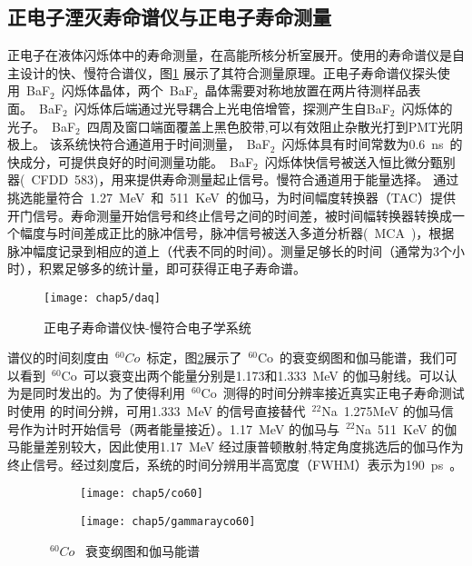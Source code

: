 \subsection{正电子湮灭寿命谱仪与正电子寿命测量}
正电子在液体闪烁体中的寿命测量，在高能所核分析室展开。使用的寿命谱仪是自主设计的快、慢符合谱仪，图\ref{fig:p541} 展示了其符合测量原理。正电子寿命谱仪探头使用~BaF$_{2}$~闪烁体晶体，两个~BaF$_{2}$~晶体需要对称地放置在两片待测样品表面。~BaF$_{2}$~闪烁体后端通过光导耦合上光电倍增管，探测产生自BaF$_{2}$~闪烁体的光子。~BaF$_{2}$~四周及窗口端面覆盖上黑色胶带,可以有效阻止杂散光打到PMT光阴极上。%
该系统快符合通道用于时间测量，~BaF$_{2}$~闪烁体具有时间常数为0.6~ns~的快成分，可提供良好的时间测量功能。~BaF$_{2}$~闪烁体快信号被送入恒比微分甄别器(~CFDD~583)，用来提供寿命测量起止信号。慢符合通道用于能量选择。
通过挑选能量符合~1.27~MeV~和~511~KeV~的伽马，为时间幅度转换器（TAC）提供开门信号。寿命测量开始信号和终止信号之间的时间差，被时间幅转换器转换成一个幅度与时间差成正比的脉冲信号，脉冲信号被送入多道分析器(~MCA~)，根据脉冲幅度记录到相应的道上（代表不同的时间）。测量足够长的时间（通常为3个小时），积累足够多的统计量，即可获得正电子寿命谱。
\begin{figure}[!htbp]
  \centering
  \texttt{[image: chap5/daq]}
  \caption{正电子寿命谱仪快-慢符合电子学系统}
  \label{fig:p541}
\end{figure}
谱仪的时间刻度由~$^{60}Co$~标定，图\ref{fig:p54}展示了~$^{60}$Co~的衰变纲图和伽马能谱，我们可以看到~$^{60}$Co~可以衰变出两个能量分别是1.173和1.333~MeV 的伽马射线。可以认为是同时发出的。为了使得利用~$^{60}$Co~测得的时间分辨率接近真实正电子寿命测试时使用%
的时间分辨，可用1.333~MeV 的信号直接替代~$^{22}$Na~1.275MeV 的伽马信号作为计时开始信号（两者能量接近）。1.17~MeV 的伽马与~$^{22}$Na~511~KeV 的伽马能量差别较大，因此使用1.17~MeV 经过康普顿散射,特定角度挑选后的伽马作为终止信号。经过刻度后，系统的时间分辨用半高宽度（FWHM）表示为190~ps~。
\begin{figure}[!htbp]
  \centering
  \begin{subfigure}[b]{\MySubFactor\textwidth}
    \texttt{[image: chap5/co60]}
  \end{subfigure}%
  \quad\quad\quad\quad%
  \begin{subfigure}[b]{\MySubFactor\textwidth}
    \texttt{[image: chap5/gammarayco60]}
  \end{subfigure}
  \caption{~$^{60}Co$~ 衰变纲图和伽马能谱}
  \label{fig:p54}
\end{figure}

